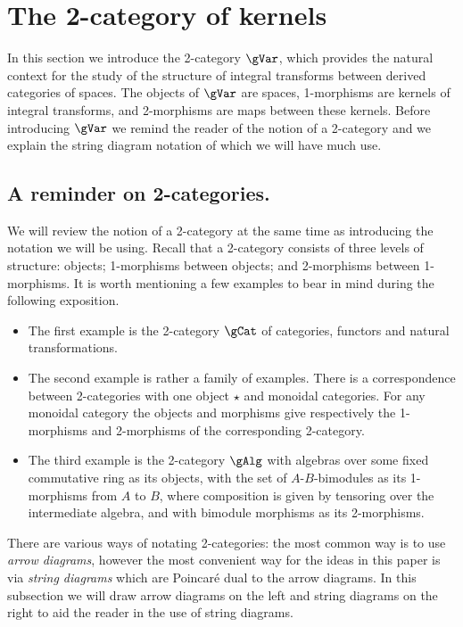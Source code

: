 \section{The 2-category of kernels}

In this section we introduce the 2-category $\gVar$, which provides
the natural context for the study of the structure of integral
transforms between derived categories of spaces.  The objects of
$\gVar$ are spaces, 1-morphisms are kernels of integral transforms,
and 2-morphisms are maps between these kernels.  Before introducing
$\gVar$ we remind the reader of the notion of a 2-category and we
explain the string diagram notation of which we will have much use.

 \subsection{A reminder on 2-categories.}
We will review the notion of a 2-category at the same time as
introducing the notation we will be using. Recall that a 2-category
consists of three levels of structure: objects; 1-morphisms between
objects; and 2-morphisms between 1-morphisms.  It is worth mentioning
a few examples to bear in mind during the following exposition.

\begin{itemize}
\item[1.] The first example is the 2-category $\gCat$ of categories,
  functors and natural transformations.
\item[2.] The second example is rather a family of examples.  There is
  a correspondence between 2-categories with one object $\star$ and
  monoidal categories.  For any monoidal category the objects and
  morphisms give respectively the 1-morphisms and 2-morphisms of the
  corresponding 2-category.
\item[3.] The third example is the 2-category $\gAlg$ with algebras
  over some fixed commutative ring as its objects, with the set of
  $A$-$B$-bimodules as its 1-morphisms from $A$ to $B$, where
  composition is given by tensoring over the intermediate algebra, and
  with bimodule morphisms as its 2-morphisms.
\end{itemize}


There are various ways of notating 2-categories: the most common way
is to use \emph{arrow diagrams}, however the most convenient way for
the ideas in this paper is via \emph{string diagrams} which are
Poincar\'e dual to the arrow diagrams.  In this subsection we will
draw arrow diagrams on the left and string diagrams on the right to
aid the reader in the use of string diagrams.


